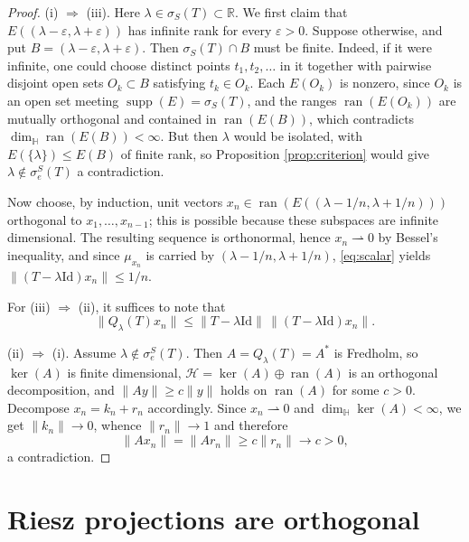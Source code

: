\documentclass[12pt,a4paper]{article}
\theoremstyle{plain}
\theoremstyle{definition}
\theoremstyle{remark}
\newcommand{\HH}{\mathbb H}
\newcommand{\RR}{\mathbb R}
\newcommand{\Id}{\mathrm{Id}}
\newcommand{\HS}{\mathcal H}
\newcommand{\dimH}{\dim_{\HH}}
\newcommand{\sigS}{\sigma_S}
\newcommand{\sigeS}{\sigma_{e}^{S}}
\DeclareMathOperator{\ran}{ran}
\DeclareMathOperator{\supp}{supp}
\begin{document}
{\begin{proof}
(i) $\Rightarrow$ (iii). Here $\lambda\in\sigS(T)\subset\RR$. We
first claim that $E((\lambda-\varepsilon,\lambda+\varepsilon))$ has
infinite rank for every $\varepsilon>0$. Suppose otherwise, and put
$B=(\lambda-\varepsilon,\lambda+\varepsilon)$. Then $\sigS(T)\cap B$
must be finite. Indeed, if it were infinite, one could choose distinct
points $t_1,t_2,\dots$ in it together with pairwise disjoint open sets
$O_k\subset B$ satisfying $t_k\in O_k$. Each $E(O_k)$ is nonzero, since
$O_k$ is an open set meeting $\supp(E)=\sigS(T)$, and the ranges
$\ran(E(O_k))$ are mutually orthogonal and contained in
$\ran(E(B))$, which contradicts $\dimH\ran(E(B))<\infty$. But then
$\lambda$ would be isolated, with $E(\{\lambda\})\le E(B)$ of finite
rank, so Proposition \ref{prop:criterion} would give
$\lambda\notin\sigeS(T)$ a contradiction.

Now choose, by induction, unit vectors
$x_n\in\ran(E((\lambda-1/n,\lambda+1/n)))$ orthogonal to
$x_1,\dots,x_{n-1}$; this is possible because these subspaces are
infinite dimensional. The resulting sequence is orthonormal, hence
$x_n\rightharpoonup0$ by Bessel's inequality, and since $\mu_{x_n}$ is
carried by $(\lambda-1/n,\lambda+1/n)$, \eqref{eq:scalar} yields
$\|(T-\lambda\Id)x_n\|\le1/n$.

For (iii) $\Rightarrow$ (ii), it suffices to note that
$$\|Q_\lambda(T)x_n\|\le\|T-\lambda\Id\|\,\|(T-\lambda\Id)x_n\|.$$

(ii) $\Rightarrow$ (i). Assume $\lambda\notin\sigeS(T)$. Then
$A=Q_\lambda(T)=A^*$ is Fredholm, so $\ker(A)$ is finite dimensional,
$\HS=\ker(A)\oplus\ran(A)$ is an orthogonal decomposition, and
$\|Ay\|\ge c\|y\|$ holds on $\ran(A)$ for some $c>0$. Decompose
$x_n=k_n+r_n$ accordingly. Since $x_n\rightharpoonup0$ and
$\dimH\ker(A)<\infty$, we get $\|k_n\|\to0$, whence $\|r_n\|\to1$ and
therefore
$$\|Ax_n\|=\|Ar_n\|\ge c\|r_n\|\to c>0,$$ a contradiction.
\end{proof}
\section{Riesz projections are orthogonal}
\label{sec:riesz}

}
\end{document}
